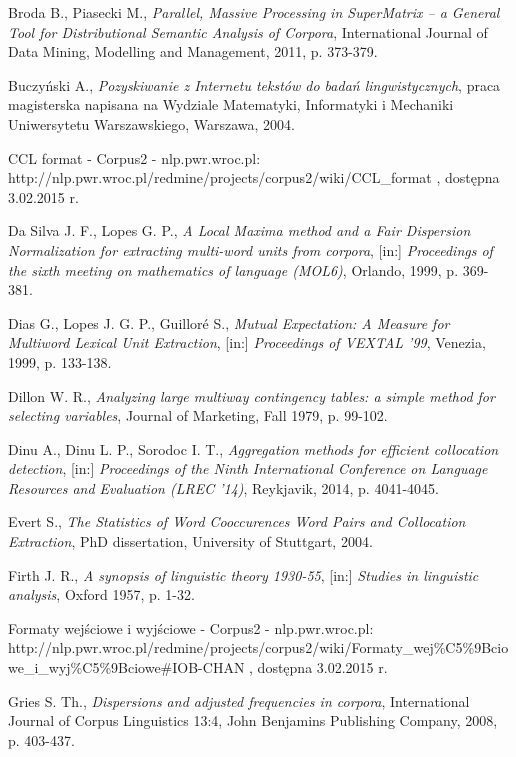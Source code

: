 \begin{thebibliography}{9}

Broda B., Piasecki M., \emph{Parallel, Massive Processing in SuperMatrix – a General Tool for Distributional Semantic Analysis of Corpora}, International Journal of Data Mining, Modelling and Management, 2011, p. 373-379.

Buczyński A., \emph{Pozyskiwanie z Internetu tekstów do badań lingwistycznych}, praca magisterska napisana na Wydziale Matematyki, Informatyki i Mechaniki Uniwersytetu Warszawskiego, Warszawa, 2004.
	 
CCL format - Corpus2 - nlp.pwr.wroc.pl: http://nlp.pwr.wroc.pl/redmine/projects/corpus2/wiki/CCL\_format , dostępna 3.02.2015 r.
	
Da Silva J. F., Lopes G. P., \emph{A Local Maxima method and a Fair Dispersion Normalization for extracting multi-word units from corpora}, [in:] \emph{Proceedings of the sixth meeting on mathematics of language (MOL6)}, Orlando, 1999, p. 369-381.

Dias G., Lopes J. G. P., Guilloré S., \emph{Mutual Expectation: A Measure for Multiword Lexical Unit Extraction}, [in:] \emph{Proceedings of VEXTAL ’99}, Venezia, 1999, p. 133-138.

Dillon W. R., \emph{Analyzing large multiway contingency tables: a simple method for selecting variables}, Journal of Marketing, Fall 1979, p. 99-102.

Dinu A., Dinu L. P., Sorodoc I. T., \emph{Aggregation methods for efficient collocation detection}, [in:] \emph{Proceedings of the Ninth International Conference on Language Resources and Evaluation (LREC ’14)}, Reykjavik, 2014, p. 4041-4045.

Evert S., \emph{The Statistics of Word Cooccurences Word Pairs and Collocation Extraction}, PhD dissertation, University of Stuttgart, 2004.

Firth J. R., \emph{A synopsis of linguistic theory 1930-55}, [in:] \emph{Studies in linguistic analysis}, Oxford 1957, p. 1-32.

Formaty wejściowe i wyjściowe - Corpus2 - nlp.pwr.wroc.pl: http://nlp.pwr.wroc.pl/redmine/projects/corpus2/wiki/Formaty\_wej\%C5\%9Bciowe\_i\_wyj\%C5\%9Bciowe\#IOB-CHAN , dostępna 3.02.2015 r.

Gries S. Th., \emph{Dispersions and adjusted frequencies in corpora}, International Journal of Corpus Linguistics 13:4, John Benjamins Publishing Company, 2008, p. 403-437.


\end{thebibliography}
